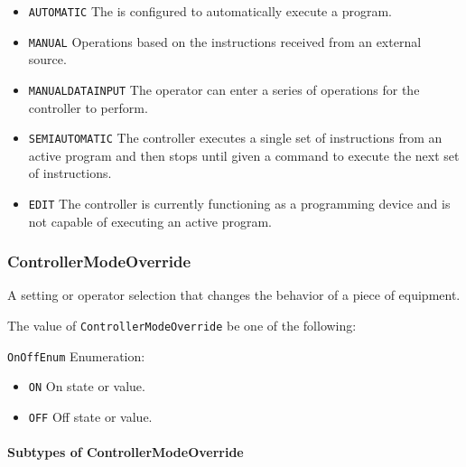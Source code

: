 \begin{itemize}
\item \texttt{AUTOMATIC} \newline The  is configured to automatically execute a program. 
\item \texttt{MANUAL} \newline Operations based on the instructions received from an external source. 
\item \texttt{MANUAL\textunderscore DATA\textunderscore INPUT} \newline The operator can enter a series of operations for the controller to perform. 
\item \texttt{SEMI\textunderscore AUTOMATIC} \newline The controller  executes a single set of instructions from an active program and then stops until given a command to execute the next set of instructions. 
\item \texttt{EDIT} \newline The controller is currently functioning as a programming device and is not capable of executing an active program. 
\end{itemize}



\subsubsection{ControllerModeOverride}
\label{sec:ControllerModeOverride}



A setting or operator selection that changes the behavior of a piece of equipment.


The value of \texttt{ControllerModeOverride} \MUST be one of the following: 


\texttt{OnOffEnum} Enumeration:

\begin{itemize}
\item \texttt{ON} \newline On state or value. 
\item \texttt{OFF} \newline Off state or value. 
\end{itemize}


\paragraph{Subtypes of ControllerModeOverride}\mbox{}
\label{sec:Subtypes of ControllerModeOverride}

